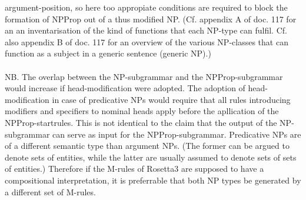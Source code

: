 argument-position, so here too appropiate conditions are required to block the
formation of NPProp out of a thus modified NP. (Cf. appendix A of doc. 117
 for an an
inventarisation of the kind of functions that each NP-type can fulfil.
Cf. also appendix B of doc. 117 for an overview of
the various NP-classes that can function as a subject in a generic sentence
(generic NP).)\\ \\ 
NB. The overlap between the NP-subgrammar and the NPProp-subgrammar would
increase if head-modification were adopted. The adoption of head-modification
in case of predicative NPs would require that all rules introducing modifiers
and specifiers to nominal heads apply before the apllication of the
NPProp-startrules. This is not identical to the claim that the output of the
NP-subgrammar can serve as input for the NPProp-subgrammar. Predicative NPs are
of a different semantic type than argument NPs. (The former can be argued to
denote sets of entities, while the latter are usually assumed to denote sets of
sets of entities.) Therefore if the M-rules of Rosetta3 are supposed to have a
compositional interpretation, it is preferrable that both NP types be generated
by a different set of M-rules. 

